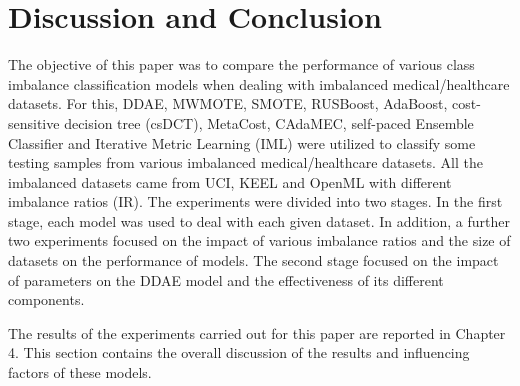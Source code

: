 \chapter{Discussion and Conclusion}
The objective of this paper was to compare the performance of various class imbalance classification models when dealing with imbalanced medical/healthcare datasets. For this, DDAE, MWMOTE, SMOTE, RUSBoost, AdaBoost, cost-sensitive decision tree (csDCT), MetaCost, CAdaMEC, self-paced Ensemble Classifier and Iterative Metric Learning (IML) were utilized to classify some testing samples from various imbalanced medical/healthcare datasets. All the imbalanced datasets came from UCI, KEEL and OpenML with different imbalance ratios (IR). The experiments were divided into two stages. In the first stage, each model was used to deal with each given dataset. In addition, a further two experiments focused on the impact of various imbalance ratios and the size of datasets on the performance of models. The second stage focused on the impact of parameters on the DDAE model and the effectiveness of its different components. 

The results of the experiments carried out for this paper are reported in Chapter 4. This section contains the overall discussion of the results and influencing factors of these models.

